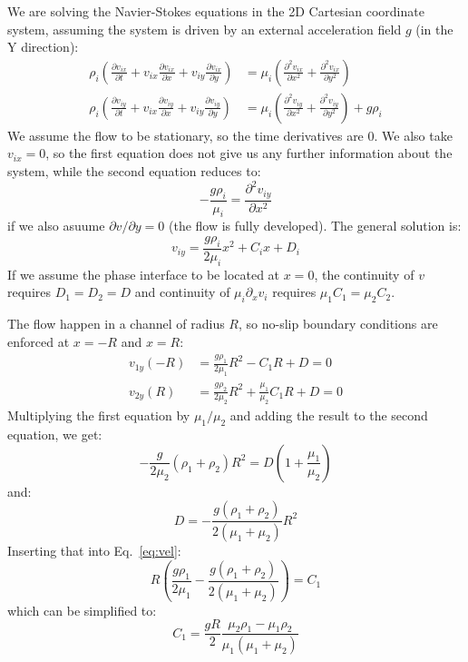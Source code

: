 \documentclass[a4paper]{report}
\begin{document}
We are solving the Navier-Stokes equations in the 2D Cartesian coordinate system, assuming the system is driven by an
external acceleration field $g$ (in the Y direction):
\begin{align}
	\rho_i \left( \frac{\partial v_{ix}}{\partial t} + v_{ix} \frac{\partial v_{ix}}{\partial x} + v_{iy} \frac{\partial v_{ix}}{\partial y} \right) &= \mu_i
		\left( \frac{\partial^2 v_{ix}}{\partial x ^2 } + \frac{\partial^2 v_{ix}}{\partial y^2} \right) \\
	\rho_i \left( \frac{\partial v_{iy}}{\partial t} + v_{ix} \frac{\partial v_{iy}}{\partial x} + v_{iy} \frac{\partial v_{iy}}{\partial y} \right) &= \mu_i
		\left( \frac{\partial^2 v_{iy}}{\partial x ^2 } + \frac{\partial^2 v_{iy}}{\partial y^2} \right) + g \rho_i
\end{align}
We assume the flow to be stationary, so the time derivatives are 0.  We also take $v_{ix} = 0$, so the first equation
does not give us any further information about the system, while the second equation reduces to:
\begin{equation}
	- \frac{g \rho_i}{\mu_i} = \frac{\partial^2 v_{iy}}{\partial x^2}
\end{equation}
if we also asuume $\partial v / \partial y = 0$ (the flow is fully developed).  The general solution is:
\begin{equation}
	v_{iy} = \frac{g \rho_i}{2 \mu_i} x^2 + C_i x + D_i
	\label{eq:gensol}
\end{equation}
If we assume the phase interface to be located at $x = 0$, the continuity of $v$ requires $D_1 = D_2 = D$ and continuity of $\mu_i \partial_x v_i$ requires $\mu_1 C_1 = \mu_2 C_2$.

The flow happen in a channel of radius $R$, so no-slip boundary conditions are enforced at $x = -R$ and $x = R$:
\begin{align}
	v_{1y}(-R) &= \frac{g \rho_1}{2 \mu_1} R^2 - C_1 R + D = 0\\
	v_{2y}(R) &= \frac{g \rho_2}{2 \mu_2} R^2 + \frac{\mu_1}{\mu_2} C_1 R + D = 0
	\label{eq:vel}
\end{align}
Multiplying the first equation by $\mu_1 / \mu_2$ and adding the result to the second equation, we get:
\begin{equation}
	- \frac{g}{2 \mu_2} (\rho_1 + \rho_2) R^2 = D \left( 1 + \frac{\mu_1}{\mu_2} \right)
\end{equation}
and:
\begin{equation}
	D = -\frac{g (\rho_1 + \rho_2)}{ 2 (\mu_1 + \mu_2)} R^2
\end{equation}
Inserting that into Eq.~\ref{eq:vel}:
\begin{equation}
	R \left(\frac{g \rho_1}{2 \mu_1} -\frac{g (\rho_1 + \rho_2)}{ 2 (\mu_1 + \mu_2)} \right) = C_1
\end{equation}
which can be simplified to:
\begin{equation}
	C_1 = \frac{g R}{2} \frac{\mu_2 \rho_1 - \mu_1 \rho_2 }{\mu_1 (\mu_1 + \mu_2)}
\end{equation}
\end{document}
